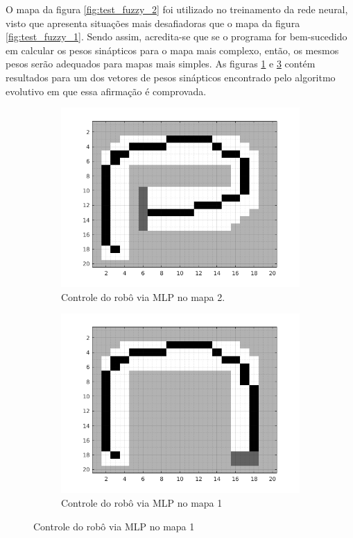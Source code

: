 O mapa da figura \ref{fig:test_fuzzy_2} foi utilizado no treinamento da rede
neural, visto que apresenta situações mais desafiadoras que o mapa da figura
\ref{fig:test_fuzzy_1}. Sendo assim, acredita-se que se o programa for
bem-sucedido em calcular os pesos sinápticos para o mapa mais complexo, então,
os mesmos pesos serão adequados para mapas mais simples. As figuras
\ref{fig:mlp_2} e \ref{fig:mlp_1} contém resultados para um dos vetores de
pesos sinápticos encontrado pelo algoritmo evolutivo em que essa afirmação é
comprovada.

\FloatBarrier
			    
	\begin{figure}[h!]
	
	\centering
	
		\begin{subfigure}{.5\textwidth}
		  \centering
		  \includegraphics[width=1\linewidth]{mlp_robot/mlp_2}
		  \caption{\centering Controle do robô via MLP no mapa 2.}
		  \label{fig:mlp_2}
		  
		\end{subfigure}%
		\begin{subfigure}{.5\textwidth}
		  \centering
		  \includegraphics[width=1\linewidth]{mlp_robot/mlp_1}
		  \caption{\centering Controle do robô via MLP no mapa 1}
		  \label{fig:mlp_1} 
		\end{subfigure}
	

\end{figure}
